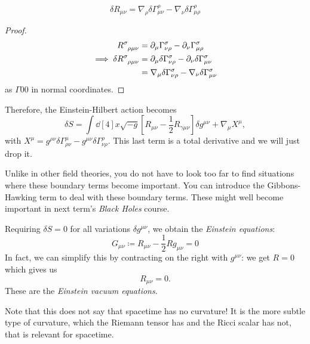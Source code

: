 \begin{claim}
  \begin{equation}
    \delta R_{\mu\nu} = \nabla_{\rho} \delta \Gamma^{\rho}_{\mu\nu} - \nabla_{\nu} \delta \Gamma^{\rho}_{\mu\rho}
  \end{equation}
\end{claim}
\begin{proof}
  \begin{align}
    R \indices{^{\sigma}_{\rho\mu\nu}} &= \partial_{\mu} \Gamma^{\sigma}_{\nu\rho} - \partial_{\nu} \Gamma^{\sigma}_{\mu\rho} \\
   \implies \delta R \indices{^{\sigma}_{\rho\mu\nu}} &= \partial_{\mu} \delta \Gamma^{\sigma}_{\nu\rho} - \partial_{\nu} \delta \Gamma^{\sigma}_{\mu\nu} \\
   &= \nabla_{\mu} \delta\Gamma^{\sigma}_{\nu\rho} - \nabla_{\nu} \delta\Gamma^{\sigma}_{\mu\nu}
  \end{align}
  as $\Gamma 0 0$ in normal coordinates.
\end{proof}

Therefore, the Einstein-Hilbert action becomes
\begin{equation}
  \delta S = \int \dd[4]{x} \sqrt{-g} \left[ R_{\mu\nu} - \frac{1}{2} R_{\gamma\mu\nu} \right] \delta g^{\mu\nu} + \nabla_{\mu} X^{\mu},
\end{equation}
with $X^{\mu} = g^{\rho\nu} \delta\Gamma^{\mu}_{\rho\nu} - g^{\mu\nu} \delta \Gamma^{\rho}_{\nu\rho}$. This last term is a total derivative and we will just drop it.
\begin{leftbar}
  \begin{remark}
    Unlike in other field theories, you do not have to look too far to find situations where these boundary terms become important.
    You can introduce the Gibbons-Hawking term to deal with these boundary terms. These might well become important in next term's \emph{Black Holes} course.
  \end{remark}
\end{leftbar}
Requiring $\delta S = 0$ for all variations $\delta g^{\mu\nu}$, we obtain the \emph{Einstein equations}:
\begin{equation}
  G_{\mu\nu} \coloneqq R_{\mu\nu} - \frac{1}{2} R g_{\mu\nu} = 0
\end{equation}
In fact, we can simplify this by contracting on the right with $g^{\mu\nu}$: we get $R = 0$ which gives us
\begin{equation}
  R_{\mu\nu} = 0.
\end{equation}
These are the \emph{Einstein vacuum equations}.
\begin{leftbar}
  \begin{remark}
    Note that this does not say that spacetime has no curvature! It is the more subtle type of curvature, which the Riemann tensor has and the Ricci scalar has not, that is relevant for spacetime.
  \end{remark}
\end{leftbar}

